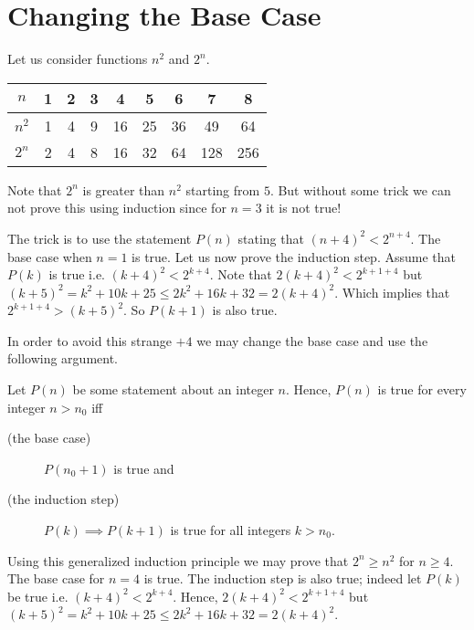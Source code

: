 \section{Changing the Base Case}
Let us consider functions $n^2$ and $2^n$.

\begin{center}
  \begin{tabular}{c | c | c | c | c | c | c | c | c}
    $n$   & 1 & 2 & 3 & 4  & 5  & 6  & 7   & 8   \\
    \hline
    $n^2$ & 1 & 4 & 9 & 16 & 25 & 36 & 49  & 64  \\
    $2^n$ & 2 & 4 & 8 & 16 & 32 & 64 & 128 & 256
  \end{tabular}
\end{center}
Note that $2^n$ is greater than $n^2$ starting from $5$. But without some trick
we can not prove this using induction since for $n = 3$ it is not true!

The trick is to use the statement $P(n)$ stating that $(n + 4)^2 < 2^{n + 4}$.
The base case when $n = 1$ is true.
Let us now prove the induction step. Assume that $P(k)$ is true i.e.
$(k + 4)^2 < 2^{k + 4}$. Note that $2(k + 4)^2 < 2^{k + 1 + 4}$ but
$(k + 5)^2 = k^2 + 10k + 25 \le 2k^2 + 16k + 32 = 2(k + 4)^2$.
Which implies that
$2^{k + 1 + 4} > (k + 5)^2$. So $P(k + 1)$ is also true.

In order to avoid this strange $+4$ we may change the base
case and use the following argument.

\begin{theorem}
\label{theorem:induction-shifted-base}
  Let $P(n)$ be some statement about an integer $n$.
  Hence, $P(n)$ is true for every integer $n > n_0$ iff
  \begin{description}
    \item [(the base case)] $P(n_0 + 1)$ is true and
    \item [(the induction step)] $P(k) \implies P(k + 1)$ is true for all
      integers $k > n_0$.
  \end{description}
\end{theorem}

Using this generalized induction principle we may prove that $2^n \ge n^2$ for
$n \ge 4$. The base case for $n = 4$ is true. The induction step is also true;
indeed let $P(k)$ be true i.e. $(k + 4)^2 < 2^{k + 4}$. Hence,
$2(k + 4)^2 < 2^{k + 1 + 4}$ but
$(k + 5)^2 = k^2 + 10k + 25 \le 2k^2 + 16k + 32 = 2(k + 4)^2$.

